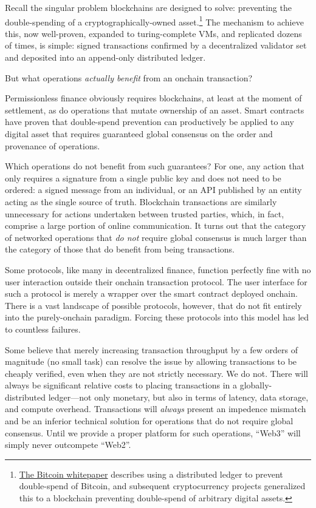 \documentclass[runningheads]{llncs}
\begin{document}
Recall the singular problem blockchains are designed to solve: preventing the double-spending of a cryptographically-owned asset.\footnote{\href{https://bitcoin.org/bitcoin.pdf}{The Bitcoin whitepaper} describes using a distributed ledger to prevent double-spend of Bitcoin, and subsequent cryptocurrency projects generalized this to a blockchain preventing double-spend of arbitrary digital assets.}
The mechanism to achieve this, now well-proven, expanded to turing-complete VMs, and replicated dozens of times, is simple: signed transactions confirmed by a decentralized validator set and deposited into an append-only distributed ledger.

But what operations \textit{actually benefit} from an onchain transaction?

Permissionless finance obviously requires blockchains, at least at the moment of settlement, as do operations that mutate ownership of an asset.
Smart contracts have proven that double-spend prevention can productively be applied to any digital asset that requires guaranteed global consensus on the order and provenance of operations.

Which operations do not benefit from such guarantees?
For one, any action that only requires a signature from a single public key and does not need to be ordered:
a signed message from an individual, or an API published by an entity acting as the single source of truth.
Blockchain transactions are similarly unnecessary for actions undertaken between trusted parties, which, in fact, comprise a large portion of online communication.
It turns out that the category of networked operations that \textit{do not} require global consensus is much larger than the category of those that do benefit from being transactions.

Some protocols, like many in decentralized finance, function perfectly fine with no user interaction outside their onchain transaction protocol.
The user interface for such a protocol is merely a wrapper over the smart contract deployed onchain.
There is a vast landscape of possible protocols, however, that do not fit entirely into the purely-onchain paradigm.
Forcing these protocols into this model has led to countless failures.

Some believe that merely increasing transaction throughput by a few orders of magnitude (no small task) can resolve the issue by allowing transactions to be cheaply verified, even when they are not strictly necessary.
We do not.
There will always be significant relative costs to placing transactions in a globally-distributed ledger—not only monetary, but also in terms of latency, data storage, and compute overhead.
Transactions will \textit{always} present an impedence mismatch and be an inferior technical solution for operations that do not require global consensus.
Until we provide a proper platform for such operations, ``Web3'' will simply never outcompete ``Web2''.
\end{document}
